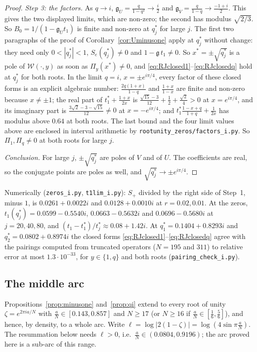 \documentclass[11pt]{article}
\theoremstyle{plain}
\theoremstyle{definition}
\theoremstyle{remark}
\theoremstyle{plain}\newtheorem*{maintheorem}{Main Theorem}
\begin{document}
\begin{proof}
\emph{Step 3: the factors.} As $q\to i$, $\mathfrak g_U=\frac q{1-q^2}\to\frac i2$ and
$\mathfrak g_V=\frac q{1-q}\to\frac{-1+i}2$. This gives the two displayed limits, which are non-zero; the
second has modulus $\sqrt{2/3}$. So $B_0=1/(1-\mathfrak g_Ut_1)$ is finite and non-zero at $q^\ast_j$ for
large $j$. The first two paragraphs of the proof of Corollary~\ref{cor:Uminusone} apply at $q^\ast_j$
without change: they need only $0<|q^\ast_j|<1$, $S_e(q^\ast_j)\ne0$ and $1-\mathfrak g\,t_1\ne0$. So
$x^\ast=\pm\sqrt{q^\ast_j}$ is a pole of $\mathcal W(\cdot,y)$ as soon as $\Pi_y(x^\ast)\ne0$, and
\eqref{eq:RJclosed1}--\eqref{eq:RJclosedq} hold at $q^\ast_j$ for both roots. In the limit $q=i$,
$x=\pm e^{i\pi/4}$, every factor of these closed forms is an explicit algebraic number:
$\frac{2q(1+x)}{1-q}$ and $\frac{1+x}{1-x}$ are finite and non-zero because $x\ne\pm1$; the real part of
$t_1^\ast+\frac{1+x}{2x}$ is $\frac{\sqrt{15}-3}{12}+\frac12+\frac{\sqrt2}4>0$ at $x=e^{i\pi/4}$, and its
imaginary part is $\frac{3\sqrt2-3-\sqrt{15}}{12}\ne0$ at $x=-e^{i\pi/4}$; and
$t_1^\ast\frac{1-x+q}{1+q}+\frac1{2x}$ has modulus above $0.64$ at both roots. The last bound and the four
limit values above are enclosed in interval arithmetic by \texttt{rootunity\_zeros/factors\_i.py}. So
$\Pi_1,\Pi_q\ne0$ at both roots for large $j$.

\emph{Conclusion.} For large $j$, $\pm\sqrt{q^\ast_j}$ are poles of $V$ and of $U$. The coefficients are
real, so the conjugate points are poles as well, and $\sqrt{q^\ast_j}\to\pm e^{i\pi/4}$.
\end{proof}

\noindent Numerically (\texttt{zeros\_i.py}, \texttt{t1lim\_i.py}): $S_+$ divided by the right side of
Step~1, minus $1$, is $0.0261+0.0022i$ and $0.0128+0.0010i$ at $r=0.02,0.01$. At the zeros,
$t_1(q^\ast_j)=0.0599-0.5540i$, $0.0663-0.5632i$ and $0.0696-0.5680i$ at $j=20,40,80$, and
$(t_1-t_1^\ast)/t^\ast_j\approx0.08+1.42i$. At $q^\ast_1=0.1404+0.8293i$ and $q^\ast_2=0.0802+0.8974i$ the closed forms
\eqref{eq:RJclosed1}--\eqref{eq:RJclosedq} agree with the pairings computed from truncated operators
($N=195$ and $311$) to relative error at most $1.3\cdot10^{-33}$, for $y\in\{1,q\}$ and both roots
(\texttt{pairing\_check\_i.py}).

\subsection{The middle arc}\label{sec:arc}

Propositions~\ref{prop:minusone} and~\ref{prop:qi} extend to every root of unity $\zeta=e^{2\pi ia/N}$ with
$\frac aN\in[0.143,0.857]$ and $N\ge17$ (or $N\ge16$ if $\frac aN\in[\frac16,\frac56]$), and hence, by density, to a whole arc.
Write $\ell=\log|2(1-\zeta)|=\log(4\sin\pi\frac aN)$. The resummation below needs $\ell>0$, i.e.\
$\frac aN\in(0.0804,0.9196)$; the arc proved here is a sub-arc of this range.
\end{document}
